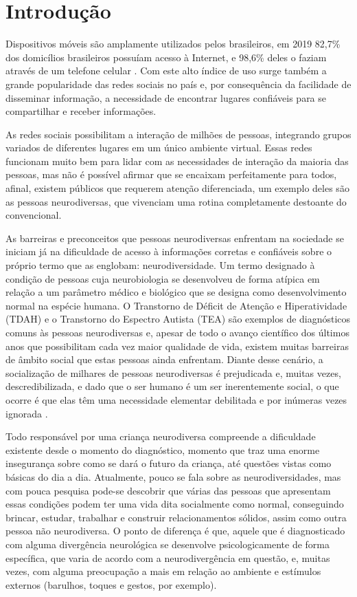 
\chapter[Introdução]{Introdução}

Dispositivos móveis são amplamente utilizados pelos brasileiros, em 2019 82,7\% dos domicílios brasileiros possuíam acesso à Internet, e 98,6\% deles o faziam através de um telefone celular \cite{ibge2019}. Com este alto índice de uso surge também a grande popularidade das redes sociais no país e, por consequência da facilidade de disseminar informação, a necessidade de encontrar lugares confiáveis para se compartilhar e receber informações.

As redes sociais possibilitam a interação de milhões de pessoas, integrando grupos variados de diferentes lugares em um único ambiente virtual. Essas redes funcionam muito bem para lidar com as necessidades de interação da maioria das pessoas, mas não é possível afirmar que se encaixam perfeitamente para todos, afinal, existem públicos que requerem atenção diferenciada, um exemplo deles são as pessoas neurodiversas, que vivenciam uma rotina completamente destoante do convencional.

As barreiras e preconceitos que pessoas neurodiversas enfrentam na sociedade se iniciam já na dificuldade de acesso à informações corretas e confiáveis sobre o próprio termo que as englobam: neurodiversidade. Um termo designado à condição de pessoas cuja neurobiologia se desenvolveu de forma atípica em relação a um parâmetro médico e biológico que se designa como desenvolvimento normal na espécie humana. O Transtorno de Déficit de Atenção e Hiperatividade (TDAH) e o Transtorno do Espectro Autista (TEA) são exemplos de diagnósticos comuns às pessoas neurodiversas e, apesar de todo o avanço científico dos últimos anos que possibilitam cada vez maior qualidade de vida, existem muitas barreiras de âmbito social que estas pessoas ainda enfrentam. Diante desse cenário, a socialização de milhares de pessoas neurodiversas é prejudicada e, muitas vezes, descredibilizada, e dado que o ser humano é um ser inerentemente social, o que ocorre é que elas têm uma necessidade elementar debilitada e por inúmeras vezes ignorada \cite{kanner43}.

Todo responsável por uma criança neurodiversa compreende a dificuldade existente desde o momento do diagnóstico, momento que traz uma enorme insegurança sobre como se dará o futuro da criança, até questões vistas como básicas do dia a dia. Atualmente, pouco se fala sobre as neurodiversidades, mas com pouca pesquisa pode-se descobrir que várias das pessoas que apresentam essas condições podem ter uma vida dita socialmente como normal, conseguindo brincar, estudar, trabalhar e construir relacionamentos sólidos, assim como outra pessoa não neurodiversa. O ponto de diferença é que, aquele que é diagnosticado com alguma divergência neurológica se desenvolve psicologicamente de forma específica, que varia de acordo com a neurodivergência em questão, e, muitas vezes, com alguma preocupação a mais em relação ao ambiente e estímulos externos (barulhos, toques e gestos, por exemplo). 

